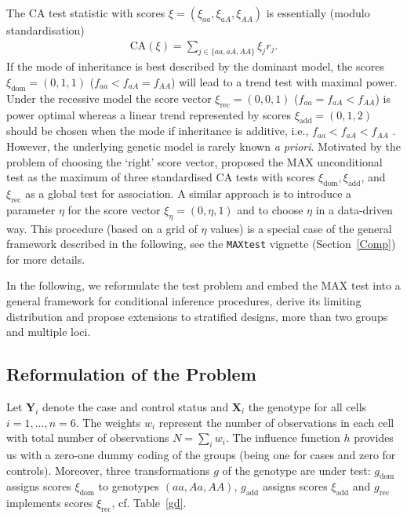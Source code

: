\documentclass[bimj,fleqn]{w-art}
\newcommand{\X}{\mathbf{X}}
\newcommand{\Y}{\mathbf{Y}}
\begin{document}
The CA test statistic with scores 
$\mathbb{\xi} = (\xi_{aa}, \xi_{aA}, \xi_{AA})$ 
is essentially (modulo standardisation)
\begin{eqnarray} \label{CAstat}
\text{CA}(\mathbb{\xi}) = \sum_{j \in \{aa, aA, AA\}} \xi_j r_j.
\end{eqnarray}
If the mode of inheritance is best described by the dominant model,
the scores $\mathbb{\xi}_\text{dom}=(0,1,1)$ 
($f_{aa} < f_{aA} = f_{AA}$) will lead to a trend test with maximal power.
Under the recessive model the score vector 
$\mathbb{\xi}_\text{rec}=(0,0,1)$ ($f_{aa} =  f_{aA} < f_{AA}$)
is power optimal whereas a linear trend represented
by scores $\mathbb{\xi}_\text{add}=(0,1,2)$ should be chosen
when the mode if inheritance is additive, i.e., $f_{aa} < f_{aA} < f_{AA}$ 
\citep{Sasieni:1997,Slager:2001}. 
However, the underlying genetic model is rarely known \textit{a priori}. 
Motivated by the problem of choosing the `right' score vector, 
\citet{Freidlin:2002} proposed the MAX unconditional test as the maximum of three standardised 
CA tests with scores 
$\mathbb{\xi}_\text{dom}, \mathbb{\xi}_\text{add}$, and $\mathbb{\xi}_\text{rec}$
as a global test for association. A similar approach \citep{Zheng:2003,Zheng:2008}
is to introduce a parameter $\eta$ for the score vector 
$\mathbb{\xi}_\eta=(0,\eta,1)$ and to choose $\eta$ in a data-driven way.
This procedure (based on a grid of $\eta$ values) is a special 
case of the general framework described in the following, see the 
\texttt{MAXtest} vignette (Section~\ref{Comp}) for more details.

In the following, we reformulate the test problem and embed the MAX test into a general framework
for conditional inference procedures, derive its limiting 
distribution and propose extensions to stratified designs, 
more than two groups and multiple loci.

\subsection{Reformulation of the Problem}
Let $\Y_i$ denote the case and control status and $\X_i$ the genotype
for all cells $i = 1, \dots, n = 6$. The weights $w_i$ represent the number of 
observations in each cell with total number of observations $N = \sum_i w_i$.
The influence function $h$ provides us with a zero-one 
dummy coding of the groups (being one for cases and zero for controls).
Moreover, three transformations $g$ of the genotype are under test: $g_\text{dom}$ 
assigns scores $\xi_\text{dom}$ to
genotypes $(aa, Aa, AA)$, $g_\text{add}$ assigns scores 
$\xi_\text{add}$ and $g_\text{rec}$
implements scores $\xi_\text{rec}$, cf. Table~\ref{gd}.
\end{document}

